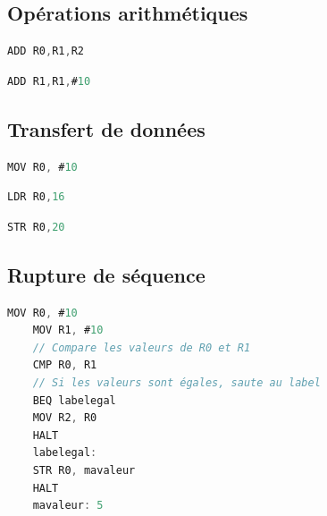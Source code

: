\documentclass[a4paper,11pt]{article}
\begin{document}
\subsection{Opérations arithmétiques}
\begin{center}
    \begin{lstlisting}[language=C , basicstyle=\small, xleftmargin=2em, xrightmargin=2em]
ADD R0,R1,R2
\end{lstlisting}
    \label{CODE}
\end{center}
\begin{center}
    \begin{lstlisting}[language=C , basicstyle=\small, xleftmargin=2em, xrightmargin=2em]
ADD R1,R1,#10
\end{lstlisting}
    \label{CODE}
\end{center}
\subsection{Transfert de données}
\begin{center}
    \begin{lstlisting}[language=C , basicstyle=\small, xleftmargin=2em, xrightmargin=2em]
    MOV R0, #10
\end{lstlisting}
    \label{CODE}
    \end{center}
    \begin{center}
        \begin{lstlisting}[language=C , basicstyle=\small, xleftmargin=2em, xrightmargin=2em]
LDR R0,16
\end{lstlisting}
        \label{CODE}
    \end{center}
    \begin{center}
        \begin{lstlisting}[language=C , basicstyle=\small, xleftmargin=2em, xrightmargin=2em]
STR R0,20
\end{lstlisting}
        \label{CODE}
    \end{center}
\subsection{Rupture de séquence}
    \begin{center}
        \begin{lstlisting}[language=C , basicstyle=\small, xleftmargin=2em, xrightmargin=2em]
    MOV R0, #10
    MOV R1, #10
    // Compare les valeurs de R0 et R1
    CMP R0, R1
    // Si les valeurs sont égales, saute au label
    BEQ labelegal 
    MOV R2, R0
    HALT 
    labelegal: 
    STR R0, mavaleur
    HALT
    mavaleur: 5
\end{lstlisting}
        \label{CODE}
        \end{center}
\end{document}

